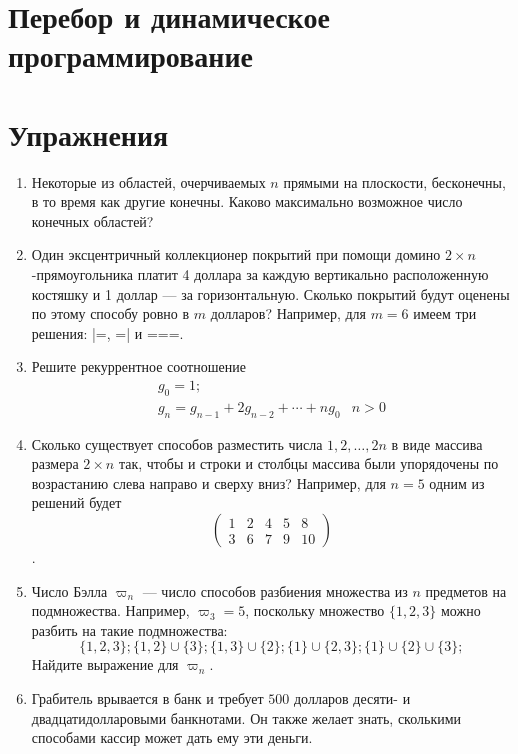 \documentclass[14pt]{book}
\begin{document}
\chapter{Перебор и динамическое программирование}

\chapter{Упражнения}
\begin{enumerate}
\item Некоторые из областей, очерчиваемых $n$ прямыми на плоскости, бесконечны,
в то время как другие конечны. Каково максимально возможное число конечных областей?

\item Один эксцентричный коллекционер покрытий при помощи домино $2 \times n$-прямоугольника
платит 4 доллара за каждую вертикально расположенную костяшку и 1 доллар --- за горизонтальную.
Сколько покрытий будут оценены по этому способу ровно в $m$ долларов? Например, для $m=6$ имеем
три решения: |=, =| и ===.

\item Решите рекуррентное соотношение
$$
\begin{array}{ll}
g_0 = 1; \\
g_n = g_{n-1} + 2g_{n-2} + \cdots + ng_0 & n>0
\end{array}
$$

\item Сколько существует способов разместить числа ${1, 2, \ldots , 2n}$ 
в виде массива размера $2 \times n$ так, чтобы и строки и столбцы массива
были упорядочены по возрастанию слева направо и сверху вниз?
Например, для $n=5$ одним из решений будет 
$$\begin{pmatrix}
1 & 2 & 4 & 5 & 8 \\
3 & 6 & 7 & 9 & 10 
\end{pmatrix}$$.

\item Число Бэлла $\varpi_n$ --- число способов разбиения множества из $n$ предметов на подмножества.
      Например, $\varpi_3=5$, поскольку множество $\{1,2,3\}$ можно разбить на такие подмножества:
      $$\{1,2,3\}; \{1,2\}\cup\{3\}; \{1,3\}\cup\{2\}; \{1\}\cup\{2,3\}; \{1\}\cup\{2\}\cup\{3\}; $$
      Найдите выражение для $\varpi_n$.

\item Грабитель врывается в банк и требует $500$ долларов десяти- и двадцатидолларовыми банкнотами.
      Он также желает знать, сколькими способами кассир может дать ему эти деньги.


\end{enumerate}
\end{document}
